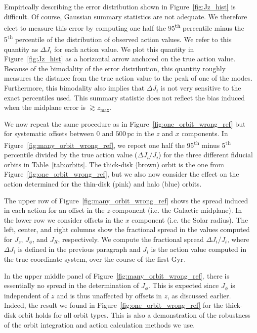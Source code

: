 \documentclass[twocolumn]{aastex62}
\newcommand{\pc}{\text{pc}}
\newcommand{\Gyr}{\text{Gyr}}
\newcommand{\uth}{\textsuperscript{th}}
\newcommand{\thincolor}{pink}
\newcommand{\thickcolor}{brown}
\newcommand{\halocolor}{blue}
\begin{document}
Empirically describing the error distribution shown in
Figure~\ref{fig:Jz_hist} is difficult. Of course, Gaussian summary statistics
are not adequate. We therefore elect to measure this error by computing one
half the 95\uth{} percentile minus the 5\uth{} percentile of the distribution
of observed action values. We refer to this quantity as $\Delta J_i$ for each
action value. We plot this quantity in Figure~\ref{fig:Jz_hist} as a
horizontal arrow anchored on the true action value. Because of the bimodality
of the error distribution, this quantity roughly measures the distance from
the true action value to the peak of one of the modes. Furthermore, this
bimodality also implies that $\Delta J_i$ is not very sensitive to the exact
percentiles used. This summary statistic does not reflect the bias induced
when the midplane error is $\gtrsim z_{\text{max}}$.

We now repeat the same procedure as in Figure~\ref{fig:one_orbit_wrong_ref}
but for systematic offsets between $0$ and $500\,\pc$ in the $z$ and $x$
components. In Figure~\ref{fig:many_orbit_wrong_ref}, we report one half the
95\uth{} minus 5\uth{} percentile divided by the true action value ($\Delta
J_i/J_i$) for the three different fiducial orbits in Table~\ref{tab:orbits}.
The thick-disk (\thickcolor) orbit is the one from
Figure~\ref{fig:one_orbit_wrong_ref}, but we also now consider the effect on
the action determined for the thin-disk (\thincolor) and halo (\halocolor)
orbits.

The upper row of Figure~\ref{fig:many_orbit_wrong_ref} shows the spread
induced in each action for an offset in the $z$-component (i.e. the Galactic
midplane). In the lower row we consider offsets in the $x$ component (i.e. the
Solar radius). The left, center, and right columns show the fractional spread
in the values computed for $J_z$, $J_{\phi}$, and $J_R$, respectively. We
compute the fractional spread $\Delta J_i/J_i$, where $\Delta J_i$ is defined
in the previous paragraph and $J_i$ is the action value computed in the true
coordinate system, over the course of the first $\Gyr$.

In the upper middle panel of Figure~\ref{fig:many_orbit_wrong_ref}, there is
essentially no spread in the determination of $J_{\phi}$. This is expected
since $J_{\phi}$ is independent of $z$ and is thus unaffected by offsets in
$z$, as discussed earlier. Indeed, the result we found in
Figure~\ref{fig:one_orbit_wrong_ref} for the thick-disk orbit holds for all
orbit types. This is also a demonstration of the robustness of the orbit
integration and action calculation methods we use.
 
\end{document}
